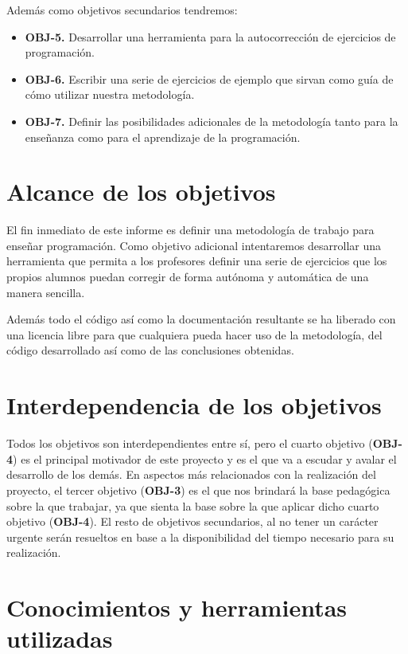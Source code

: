 Además como objetivos secundarios tendremos:

\begin{itemize}
  \item \textbf{OBJ-5.} Desarrollar una herramienta para la autocorrección de ejercicios de programación.
  \item \textbf{OBJ-6.} Escribir una serie de ejercicios de ejemplo que sirvan como guía de cómo utilizar nuestra metodología.
  \item \textbf{OBJ-7.} Definir las posibilidades adicionales de la metodología tanto para la enseñanza como para el aprendizaje de la programación.
\end{itemize}

\section{Alcance de los objetivos}
El fin inmediato de este informe es definir una metodología de trabajo para enseñar programación. Como objetivo adicional intentaremos desarrollar una herramienta que permita a los profesores definir una serie de ejercicios que los propios alumnos puedan corregir de forma autónoma y automática de una manera sencilla.

\bigskip
Además todo el código así como la documentación resultante se ha liberado con una licencia libre para que cualquiera pueda hacer uso de la metodología, del código desarrollado así como de las conclusiones obtenidas.

\section{Interdependencia de los objetivos}

Todos los objetivos son interdependientes entre sí, pero el cuarto objetivo (\textbf{OBJ-4}) es el principal motivador de este proyecto y es el que va a escudar y avalar el desarrollo de los demás. En aspectos más relacionados con la realización del proyecto, el tercer objetivo (\textbf{OBJ-3}) es el que nos brindará la base pedagógica sobre la que trabajar, ya que sienta la base sobre la que aplicar dicho cuarto objetivo (\textbf{OBJ-4}). El resto de objetivos secundarios, al no tener un carácter urgente serán resueltos en base a la disponibilidad del tiempo necesario para su realización.

\section{Conocimientos y herramientas utilizadas}

